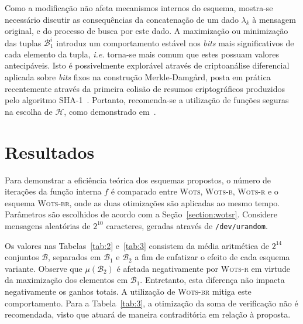 \documentclass[12pt,notitlepage]{report}
\newcommand{\hh}{\mathcal{H}}
\newcommand{\wots}{\textsc{Wots}}
\begin{document}
Como a modificação não afeta mecanismos internos do esquema, mostra-se necessário discutir as consequências da concatenação de um dado $\lambda_k$ à mensagem original, e do processo de busca por este dado. A maximização ou minimização das tuplas $\mathcal{B}_{1}^{i}$ introduz um comportamento estável nos \emph{bits} mais significativos de cada elemento da tupla, \emph{i.e.} torna-se mais comum que estes possuam valores antecipáveis. Isto é possivelmente explorável através de criptoanálise diferencial aplicada sobre \emph{bits} fixos na construção Merkle-Damgård, posta em prática recentemente através da primeira colisão de resumos criptográficos produzidos pelo algoritmo SHA-1~\cite{Stevens2017}. Portanto, recomenda-se a utilização de funções seguras na escolha de $\hh{}$, como demonstrado em~\cite{Hlsing2013}.

\section{Resultados}
\label{section:results}

Para demonstrar a eficiência teórica dos esquemas propostos, o número de iterações da função interna $f$ é comparado entre \wots{}, \textsc{Wots-b}, \textsc{Wots-r} e o esquema \textsc{Wots-br}, onde as duas otimizações são aplicadas ao mesmo tempo. Parâmetros são escolhidos de acordo com a Seção~\ref{section:wotsr}. Considere mensagens aleatórias de $2^{10}$ caracteres, geradas através de \texttt{/dev/urandom}.

Os valores nas Tabelas~\ref{tab:2} e~\ref{tab:3} consistem da média aritmética de $2^{14}$ conjuntos $\mathcal{B}$, separados em $\mathcal{B}_1$ e $\mathcal{B}_2$ a fim de enfatizar o efeito de cada esquema variante. Observe que $\mu(\mathcal{B}_2)$ é afetada negativamente por \textsc{Wots-r} em virtude da maximização dos elementos em $\mathcal{B}_1$. Entretanto, esta diferença não impacta negativamente os ganhos totais. A utilização de \textsc{Wots-br} mitiga este comportamento. Para a Tabela~\ref{tab:3}, a otimização da soma de verificação não é recomendada, visto que atuará de maneira contraditória em relação à proposta.
\end{document}
